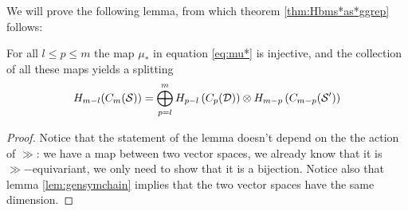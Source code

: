 We will prove the following lemma, from which theorem \ref{thm:Hbms*as*ggrep} follows:
\begin{lem}
 \label{lem:oplussplitting}
For all $l\leq p\leq m$ the map $\mu_*$ in equation \ref{eq:mu*} is injective, and the collection
of all these maps yields a splitting
\[
 H_{m-l}(C_m(\mathcal{S}))=\bigoplus_{p=l}^m H_{p-l}\left(C_p(\mathcal{D})\right)\otimes H_{m-p}\left(C_{m-p}(\mathcal{S}')\right)
\]
\end{lem}
\begin{proof}
Notice that the statement of the lemma doesn't depend on the the action of $\gg$:
we have a map between two vector spaces, we already know that it is $\gg-$equivariant,
we only need to show that it is a bijection. Notice also that lemma \ref{lem:gensymchain}
implies that the two vector spaces have the same dimension.
% 
% 
% 


\end{proof}
